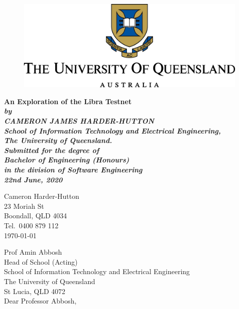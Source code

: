 \documentclass[12pt,openany,a4paper]{book}
\renewcommand{\baselinestretch}{1.2}	%
\begin{document}
\frontmatter

\begin{titlepage}
\renewcommand{\baselinestretch}{1.0}
\begin{center}
\begin{figure}[h]
\includegraphics[width=\textwidth]{uq_logo.png}
\end{figure}
\vspace*{25mm}
\Huge\bf
		An Exploration of the Libra Testnet\\
\vspace{20mm}
\large\sl
		by\\
		CAMERON JAMES HARDER-HUTTON
		\medskip\\
\rm
		School of Information Technology and Electrical Engineering,\\
		The University of Queensland.\\
\vspace{30mm}
		Submitted for the degree of\\
		Bachelor of Engineering (Honours)
		\smallskip\\
\normalsize
		in the division of Software Engineering
		\medskip\\
\large
		22nd June, 2020		
\end{center}
\end{titlepage}

\cleardoublepage

\begin{flushright}
    Cameron Harder-Hutton\\
	23 Moriah St\\
	Boondall, QLD 4034\\
	Tel.\ 0400 879 112\\
	\medskip
	\today
\end{flushright}
\begin{flushleft}
    Prof Amin Abbosh\\
    Head of School (Acting)\\
    School of Information Technology and Electrical Engineering\\
    The University of Queensland\\
    St Lucia, QLD 4072\\
    \bigskip\bigskip
    Dear Professor Abbosh,
\end{flushleft}
\end{document}
